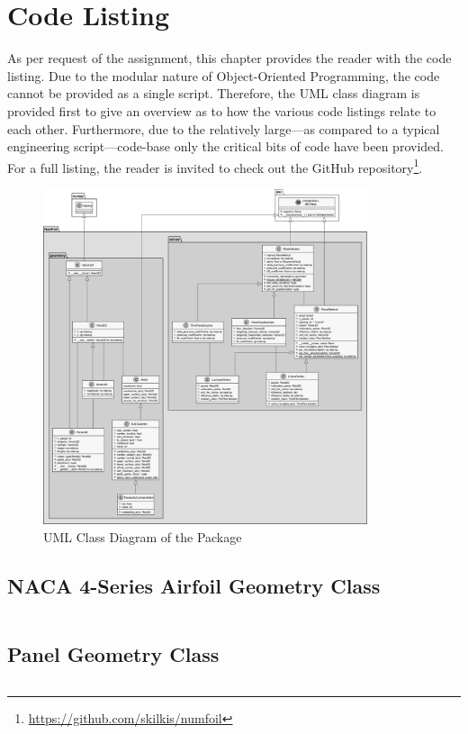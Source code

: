 \chapter{Code Listing}
As per request of the assignment, this chapter provides the reader with the
code listing. Due to the modular nature of Object-Oriented Programming, the
code cannot be provided as a single script. Therefore, the UML class diagram is
provided first to give an overview as to how the various code listings relate
to each other. Furthermore, due to the relatively large---as compared to a
typical engineering script---code-base only the critical bits of code have been
provided. For a full listing, the reader is invited to check out the GitHub
repository\footnote{\url{https://github.com/skilkis/numfoil}}.

\begin{figure}[H]
    \centering
    \includegraphics[width=0.85\textwidth]{static/class_diagram.pdf}
    \caption{UML Class Diagram of the \numfoil Package}
\end{figure}

\newpage

\section{NACA 4-Series Airfoil Geometry Class}
\inputminted[firstline=133,lastline=301]{python}{../src/numfoil/geometry/airfoil.py}

\section{Panel Geometry Class}
\inputminted{python}{../src/numfoil/geometry/panel.py}

